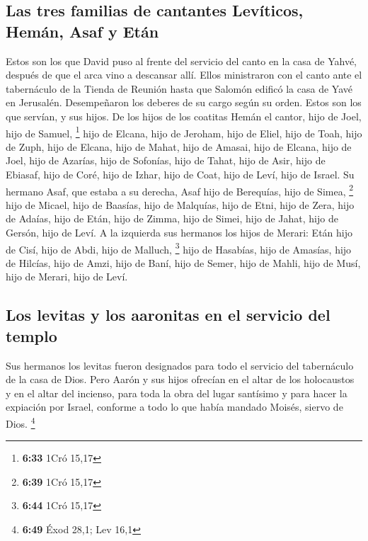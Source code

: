 \hypertarget{las-tres-familias-de-cantantes-levuxedticos-hemuxe1n-asaf-y-etuxe1n}{%
\subsection{Las tres familias de cantantes Levíticos, Hemán, Asaf y
Etán}\label{las-tres-familias-de-cantantes-levuxedticos-hemuxe1n-asaf-y-etuxe1n}}

 Estos son los que David puso al frente del servicio del
canto en la casa de Yahvé, después de que el arca vino a descansar allí.
 Ellos ministraron con el canto ante el tabernáculo de la
Tienda de Reunión hasta que Salomón edificó la casa de Yavé en
Jerusalén. Desempeñaron los deberes de su cargo según su orden.
 Estos son los que servían, y sus hijos. De los hijos de
los coatitas Hemán el cantor, hijo de Joel, hijo de Samuel, \footnote{\textbf{6:33}
  1Cró 15,17}  hijo de Elcana, hijo de Jeroham, hijo de
Eliel, hijo de Toah,  hijo de Zuph, hijo de Elcana, hijo
de Mahat, hijo de Amasai,  hijo de Elcana, hijo de Joel,
hijo de Azarías, hijo de Sofonías,  hijo de Tahat, hijo
de Asir, hijo de Ebiasaf, hijo de Coré,  hijo de Izhar,
hijo de Coat, hijo de Leví, hijo de Israel.  Su hermano
Asaf, que estaba a su derecha, Asaf hijo de Berequías, hijo de Simea,
\footnote{\textbf{6:39} 1Cró 15,17}  hijo de Micael, hijo
de Baasías, hijo de Malquías,  hijo de Etni, hijo de
Zera, hijo de Adaías,  hijo de Etán, hijo de Zimma, hijo
de Simei,  hijo de Jahat, hijo de Gersón, hijo de Leví.
 A la izquierda sus hermanos los hijos de Merari: Etán
hijo de Cisí, hijo de Abdi, hijo de Malluch, \footnote{\textbf{6:44}
  1Cró 15,17}  hijo de Hasabías, hijo de Amasías, hijo de
Hilcías,  hijo de Amzi, hijo de Baní, hijo de Semer,
 hijo de Mahli, hijo de Musí, hijo de Merari, hijo de
Leví.

\hypertarget{los-levitas-y-los-aaronitas-en-el-servicio-del-templo}{%
\subsection{Los levitas y los aaronitas en el servicio del
templo}\label{los-levitas-y-los-aaronitas-en-el-servicio-del-templo}}

 Sus hermanos los levitas fueron designados para todo el
servicio del tabernáculo de la casa de Dios.  Pero Aarón
y sus hijos ofrecían en el altar de los holocaustos y en el altar del
incienso, para toda la obra del lugar santísimo y para hacer la
expiación por Israel, conforme a todo lo que había mandado Moisés,
siervo de Dios. \footnote{\textbf{6:49} Éxod 28,1; Lev 16,1}

